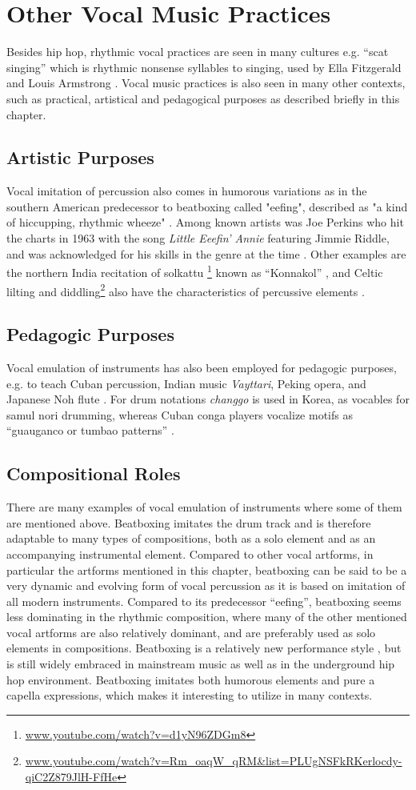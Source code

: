 \section{Other Vocal Music Practices}
Besides hip hop, rhythmic vocal practices are seen in many cultures \citep{Sinyor05} e.g. “scat singing” which is rhythmic nonsense syllables to singing, used by Ella Fitzgerald and Louis Armstrong \citep{Janer_syllablingon}. Vocal music practices is also seen in many other contexts, such as practical, artistical and pedagogical purposes as described briefly in this chapter.
\subsection{ Artistic Purposes}
Vocal imitation of percussion also comes in humorous variations as in the southern American predecessor to beatboxing called "eefing", described as "a kind of hiccupping, rhythmic wheeze" \citep{jennifersharpe2006}. Among known artists was Joe Perkins who hit the charts in 1963 with the song \textit{Little Eeefin' Annie} featuring Jimmie Riddle, and was acknowledged for his skills in the genre at the time  \citep{jennifersharpe2006}. Other examples are the northern India recitation of solkattu \footnote{\url{ www.youtube.com/watch?v=d1yN96ZDGm8}} known as “Konnakol” \citep{proctor2012}, and Celtic lilting and diddling\footnote{\url{www.youtube.com/watch?v=Rm_oaqW_qRM&list=PLUgNSFkRKerlocdy-qiC2Z879JlH-FfHe}} also have the characteristics of percussive elements \citep{proctor2012}.	
\subsection{ Pedagogic Purposes}
Vocal emulation of instruments has also been employed for pedagogic purposes, e.g. to teach Cuban percussion, Indian music \textit{Vayttari}, Peking opera, and Japanese Noh flute \citep{Janer_syllablingon}. For drum notations \textit{changgo} is used in Korea, as vocables for samul nori drumming, whereas Cuban conga players vocalize motifs as “guauganco or tumbao patterns” \citep{proctor2012}.
\subsection{ Compositional Roles }
There are many examples of vocal emulation of instruments where some of them are mentioned above. Beatboxing imitates the drum track and is therefore adaptable to many types of compositions, both as a solo element and as an accompanying instrumental element. Compared to other vocal artforms, in particular the artforms mentioned in this chapter, beatboxing can be said to be a very dynamic and evolving form of vocal percussion as it is based on imitation of all modern instruments. Compared to its predecessor “eefing”, beatboxing seems less dominating in the rhythmic composition, where many of the other mentioned vocal artforms are also relatively dominant, and are preferably used as solo elements in compositions. Beatboxing is a relatively new performance style \citep{Stowell2008}, but is still widely embraced in mainstream music as well as in the underground hip hop environment. Beatboxing imitates both humorous elements and pure a capella expressions, which makes it interesting to utilize in many contexts.